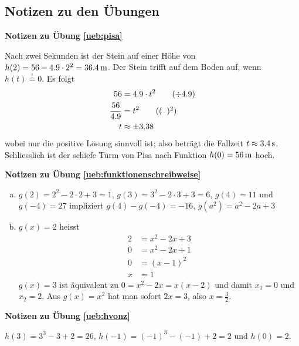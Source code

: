 \documentclass[%
<<<<<<< Updated upstream
11pt,%
twoside,%
titlepage,%
german,%
=======
11pt,%
twoside,%
titlepage,%
swissgerman,%
>>>>>>> Stashed changes
headsepline%
]{scrartcl}
\newcommand{\faReturnGray}{\textcolor{gray}{\faMailReply}} %
\theoremstyle{definition}
\theoremstyle{plain}
\newcommand{\concatueb}[1]{ueb:#1}%
\newcommand{\concatlsg}[1]{lsg:#1}%
\newenvironment{lsg}[1]{%
    \par\noindent\textbf{Notizen zu Übung \ref{\concatueb{#1}}}\label{\concatlsg{#1}}
    \hfill\hyperref[\concatueb{#1}]{\faReturnGray}\par %
}{%
    \par%
}
\newcommand{\concatueb}[1]{ueb:#1}%
\newcommand{\concatlsg}[1]{lsg:#1}%
\newenvironment{lsg}[1]{%
    \par\noindent\textbf{Notizen zu Übung \ref{\concatueb{#1}}.}%
    \label{\concatlsg{#1}}
}{%
    \par%
}
\begin{document}
\clearpage

\subsection{Notizen zu den Übungen}

\begin{lsg}{pisa}
	Nach zwei Sekunden ist der Stein auf einer H\"ohe von $h(2)=56-4.9\cdot2^{2}=\unit[36.4]{m}$. Der Stein trifft auf dem Boden auf, wenn $h(t)\stackrel{!}{=}0$. Es folgt
	\begin{align*}
		56&=4.9\cdot t^{2}\tag{$\div4.9$}\\
		\frac{56}{4.9} &= t^{2}\tag{$(\phantom{x})^{2}$}\\
		t &\approx \pm3.38
	\end{align*}
	wobei nur die positive L\"osung sinnvoll ist; also betr\"agt die Fallzeit $t\approx\unit[3.4]{s}$. Schliesslich ist der schiefe Turm von Pisa nach Funktion $h(0)=\unit[56]{m}$ hoch.
\end{lsg}
\begin{lsg}{funktionenschreibweise}
	\begin{enumerate}[a)]
		\item $g(2)=2^{2}-2\cdot2+3=1$, $g(3)=3^{2}-2\cdot3+3=6$, $g(4)=11$ und $g(-4)=27$ impliziert $g(4)-g(-4)=-16$, $g(a^{2})=a^{2}-2a+3$
		\item $g(x)=2$ heisst
		\begin{align*}
			2 &= x^{2}-2x+3\tag{$-2$}\\
			0 &= x^{2}-2x+1\\
			0 &= (x-1)^{2}\\
			x &= 1
		\end{align*}
		$g(x)=3$ ist \"aquivalent zu $0=x^{2}-2x=x(x-2)$ und damit $x_1=0$ und $x_{2}=2$. Aus  $g(x)=x^{2}$ hat man sofort $2x=3$, also $x=\frac{3}{2}$.
	\end{enumerate}
\end{lsg}
\begin{lsg}{hvonz}
	$h(3)=3^{3}-3+2=26$, $h(-1)=(-1)^{3}-(-1)+2=2$ und $h(0)=2$.
\end{lsg}
\end{document}
